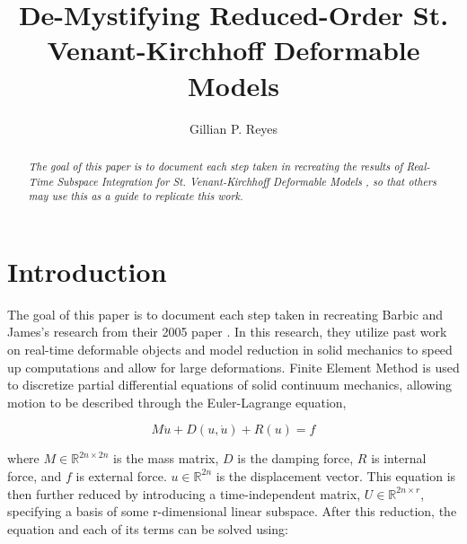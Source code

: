 \documentclass[twocolumn,10pt]{asme2ej}
\title{De-Mystifying Reduced-Order St. Venant-Kirchhoff Deformable Models}
\author{Gillian P. Reyes
}
\begin{document}
\maketitle

\begin{abstract}
{\it The goal of this paper is to document each step taken in recreating
the results of Real-Time Subspace Integration for St. Venant-Kirchhoff Deformable Models \cite{barbic}, so that
others may use this as a guide to replicate this work.
}
\end{abstract}

%

\section{Introduction}

The goal of this paper is to document each step taken in recreating Barbic and James's research from their 2005
paper \cite{barbic}. In this research, they utilize past work on real-time deformable objects and model reduction in solid mechanics to speed up computations and allow for large deformations. Finite Element Method is used to discretize partial differential equations of solid continuum mechanics, allowing motion to be described through the Euler-Lagrange equation,

\begin{equation}
M\ddot u + D(u, \dot u) + R(u) = f
\label{eq_motion}
\end{equation}

where $M \in \mathbb{R}^{2n \times 2n }$ is the mass matrix, $D$ is the damping force, $R$ is internal force, and $f$ is external force. $u \in \mathbb{R}^{2n}$ is the displacement vector. This equation is then further reduced by introducing a time-independent matrix, $U \in \mathbb{R}^{2n \times r}$, specifying a basis of some r-dimensional linear subspace. After this reduction, the equation and each of its terms can be solved using:
\end{document}
